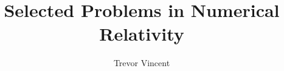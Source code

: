 

 
 \author{Trevor Vincent}
\title{Selected Problems in Numerical Relativity}



%
\setcounter{tocdepth}{2}







